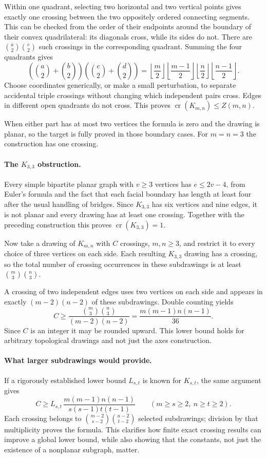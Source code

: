 \documentclass[11pt,a4paper]{article}
\begin{document}
Within one quadrant, selecting two horizontal and two vertical points gives exactly one crossing between the two oppositely ordered connecting segments. This can be checked from the order of their endpoints around the boundary of their convex quadrilateral: its diagonals cross, while its sides do not. There are $\binom a2\binom c2$ such crossings in the corresponding quadrant. Summing the four quadrants gives
\[
\left(\binom a2+\binom b2\right)
\left(\binom c2+\binom d2\right)
=\left\lfloor\frac m2\right\rfloor\left\lfloor\frac{m-1}2\right\rfloor
 \left\lfloor\frac n2\right\rfloor\left\lfloor\frac{n-1}2\right\rfloor.
\]
Choose coordinates generically, or make a small perturbation, to separate accidental triple crossings without changing which independent pairs cross. Edges in different open quadrants do not cross. This proves $\operatorname{cr}(K_{m,n})\le Z(m,n)$.

When either part has at most two vertices the formula is zero and the drawing is planar, so the target is fully proved in those boundary cases. For $m=n=3$ the construction has one crossing.

\paragraph{The $K_{3,3}$ obstruction.}
Every simple bipartite planar graph with $v\ge3$ vertices has $e\le2v-4$, from Euler's formula and the fact that each facial boundary has length at least four after the usual handling of bridges. Since $K_{3,3}$ has six vertices and nine edges, it is not planar and every drawing has at least one crossing. Together with the preceding construction this proves $\operatorname{cr}(K_{3,3})=1$.

Now take a drawing of $K_{m,n}$ with $C$ crossings, $m,n\ge3$, and restrict it to every choice of three vertices on each side. Each resulting $K_{3,3}$ drawing has a crossing, so the total number of crossing occurrences in these subdrawings is at least $\binom m3\binom n3$.

A crossing of two independent edges uses two vertices on each side and appears in exactly $(m-2)(n-2)$ of these subdrawings. Double counting yields
\[
C\ge\frac{\binom m3\binom n3}{(m-2)(n-2)}
=\frac{m(m-1)n(n-1)}{36}.
\]
Since $C$ is an integer it may be rounded upward. This lower bound holds for arbitrary topological drawings and not just the axes construction.

\paragraph{What larger subdrawings would provide.}
If a rigorously established lower bound $L_{s,t}$ is known for $K_{s,t}$, the same argument gives
\[
C\ge L_{s,t}\,
\frac{m(m-1)n(n-1)}{s(s-1)t(t-1)}
\qquad(m\ge s\ge2,\ n\ge t\ge2).
\]
Each crossing belongs to $\binom{m-2}{s-2}\binom{n-2}{t-2}$ selected subdrawings; division by that multiplicity proves the formula. This clarifies how finite exact crossing results can improve a global lower bound, while also showing that the constants, not just the existence of a nonplanar subgraph, matter.
\end{document}
